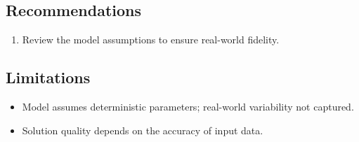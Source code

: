 \documentclass[11pt, a4paper]{article}
\begin{document}

\subsection{Recommendations}

\begin{enumerate}
  \item Review the model assumptions to ensure real-world fidelity.
\end{enumerate}

\subsection{Limitations}

\begin{polyawarnbox}
\begin{itemize}
  \item Model assumes deterministic parameters; real-world variability not captured.
  \item Solution quality depends on the accuracy of input data.
\end{itemize}
\end{polyawarnbox}

\end{document}
